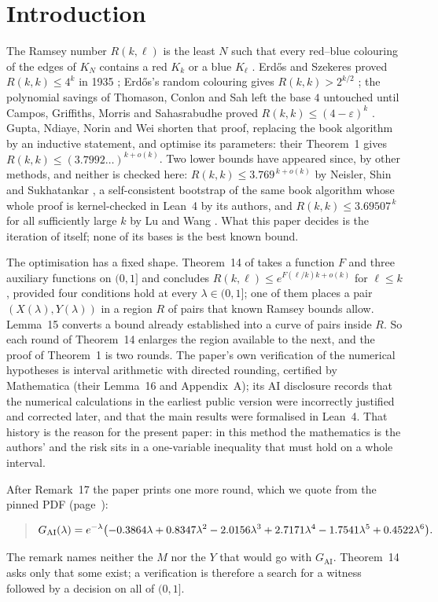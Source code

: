 \documentclass[11pt]{article}
\newcommand{\GAI}{G_{\mathrm{AI}}}
\begin{document}
\section{Introduction}

The Ramsey number $R(k,\ell)$ is the least $N$ such that every red--blue colouring of the edges of $K_N$ contains a red $K_k$ or a blue $K_\ell$ \cite{Ram30}. Erd\H{o}s and Szekeres proved $R(k,k)\le 4^k$ in 1935 \cite{ES35}; Erd\H{o}s's random colouring gives $R(k,k)>2^{k/2}$ \cite{Erd47}; the polynomial savings of Thomason, Conlon and Sah \cite{Tho88,Con09,Sah23} left the base $4$ untouched until Campos, Griffiths, Morris and Sahasrabudhe proved $R(k,k)\le(4-\varepsilon)^k$ \cite{CGMS}. Gupta, Ndiaye, Norin and Wei \cite{GNNW} shorten that proof, replacing the book algorithm by an inductive statement, and optimise its parameters: their Theorem~1 gives $R(k,k)\le(3.7992\ldots)^{k+o(k)}$. Two lower bounds have appeared since, by other methods, and neither is checked here: $R(k,k)\le3.769^{\,k+o(k)}$ by Neisler, Shin and Sukhatankar \cite{NSS26}, a self-consistent bootstrap of the same book algorithm whose whole proof is kernel-checked in Lean~4 by its authors, and $R(k,k)\le3.69507^{\,k}$ for all sufficiently large $k$ by Lu and Wang \cite{LW26}. What this paper decides is the iteration of \cite{GNNW} itself; none of its bases is the best known bound.

The optimisation has a fixed shape. Theorem~14 of \cite{GNNW} takes a function $F$ and three auxiliary functions on $(0,1]$ and concludes $R(k,\ell)\le e^{F(\ell/k)k+o(k)}$ for $\ell\le k$, provided four conditions hold at every $\lambda\in(0,1]$; one of them places a pair $(X(\lambda),Y(\lambda))$ in a region $R$ of pairs that known Ramsey bounds allow. Lemma~15 converts a bound already established into a curve of pairs inside $R$. So each round of Theorem~14 enlarges the region available to the next, and the proof of Theorem~1 is two rounds. The paper's own verification of the numerical hypotheses is interval arithmetic with directed rounding, certified by Mathematica (their Lemma~16 and Appendix~A); its AI disclosure records that the numerical calculations in the earliest public version were incorrectly justified and corrected later, and that the main results were formalised in Lean~4. That history is the reason for the present paper: in this method the mathematics is the authors' and the risk sits in a one-variable inequality that must hold on a whole interval.

After Remark~17 the paper prints one more round, which we quote from the pinned PDF (page~\RemarkPage):
\begin{quote}\small
\RemarkPre
\[
\GAI(\lambda)=e^{-\lambda}\bigl(\QaiPoly\bigr).
\]
\RemarkPost
\end{quote}
The remark names neither the $M$ nor the $Y$ that would go with $\GAI$. Theorem~14 asks only that some exist; a verification is therefore a search for a witness followed by a decision on all of $(0,1]$.
\end{document}
